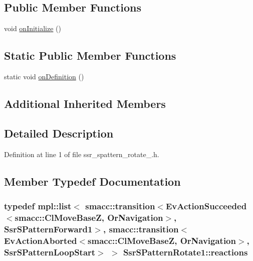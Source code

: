 \subsection*{Public Member Functions}
\begin{DoxyCompactItemize}
\item 
void \hyperlink{structSsrSPatternRotate1_a8e3038ccd3fd6007ea7614ba703b7948}{on\+Initialize} ()
\end{DoxyCompactItemize}
\subsection*{Static Public Member Functions}
\begin{DoxyCompactItemize}
\item 
static void \hyperlink{structSsrSPatternRotate1_aa1ceb73aab8fe995f57e02b9edec44a8}{on\+Definition} ()
\end{DoxyCompactItemize}
\subsection*{Additional Inherited Members}


\subsection{Detailed Description}


Definition at line 1 of file ssr\+\_\+spattern\+\_\+rotate\+\_.\+h.



\subsection{Member Typedef Documentation}
\subsubsection[{\texorpdfstring{reactions}{reactions}}]{\setlength{\rightskip}{0pt plus 5cm}typedef mpl\+::list$<$ {\bf smacc\+::transition}$<$Ev\+Action\+Succeeded$<${\bf smacc\+::\+Cl\+Move\+BaseZ}, Or\+Navigation$>$, {\bf Ssr\+S\+Pattern\+Forward1}$>$, {\bf smacc\+::transition}$<$Ev\+Action\+Aborted$<${\bf smacc\+::\+Cl\+Move\+BaseZ}, Or\+Navigation$>$, {\bf Ssr\+S\+Pattern\+Loop\+Start}$>$ $>$ {\bf Ssr\+S\+Pattern\+Rotate1\+::reactions}}\hypertarget{structSsrSPatternRotate1_a47facb02d41f2e17a062221c111a4457}{}\label{structSsrSPatternRotate1_a47facb02d41f2e17a062221c111a4457}


